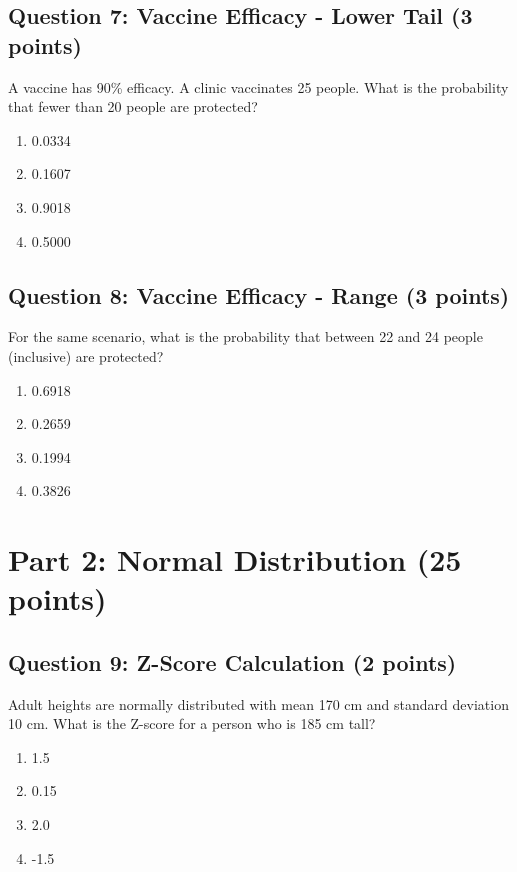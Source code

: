 \documentclass[11pt]{article}
\begin{document}
\vspace{0.5cm}

\subsection*{Question 7: Vaccine Efficacy - Lower Tail (3 points)}

A vaccine has 90\% efficacy. A clinic vaccinates 25 people. What is the probability that fewer than 20 people are protected?

\begin{enumerate}[label=\Alph*)]
\item 0.0334
\item 0.1607
\item 0.9018
\item 0.5000
\end{enumerate}

\vspace{0.5cm}

\subsection*{Question 8: Vaccine Efficacy - Range (3 points)}

For the same scenario, what is the probability that between 22 and 24 people (inclusive) are protected?

\begin{enumerate}[label=\Alph*)]
\item 0.6918
\item 0.2659
\item 0.1994
\item 0.3826
\end{enumerate}

\vspace{0.5cm}

\section{Part 2: Normal Distribution (25 points)}

\subsection*{Question 9: Z-Score Calculation (2 points)}

Adult heights are normally distributed with mean 170 cm and standard deviation 10 cm. What is the Z-score for a person who is 185 cm tall?

\begin{enumerate}[label=\Alph*)]
\item 1.5
\item 0.15
\item 2.0
\item -1.5
\end{enumerate}
\end{document}
